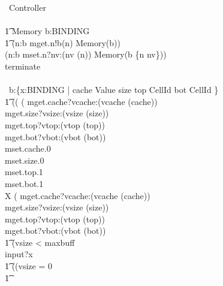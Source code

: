 \documentclass[10pt]{article}
\begin{document}
\begin{circus}
    \circprocess\ Controller \circdef \\
    \circbegin \\
    \t1
        Memory \circdef
            \circvres b:BINDING \circspot \\
            \t1
                (\Extchoice n:\dom b \circspot mget.n!b(n) \then Memory(b)) \\
                \extchoice (\Extchoice n:\dom b \circspot mset.n?nv:(nv \in \delta(n)) \then Memory(b \oplus \{n \mapsto nv\}))\\
                \extchoice terminate \then \Skip \\
        \\
        \circspot
            \circvar\ b:\{x:BINDING | cache \in Value \land size \in \nat \land top \in CellId \land bot \in CellId \} \circspot \\
            \t1
            ((
            (
                mget.cache?vcache:(vcache \in \delta(cache)) \then \\
                mget.size?vsize:(vsize \in \delta(size)) \then \\
                mget.top?vtop:(vtop \in \delta(top)) \then \\
                mget.bot?vbot:(vbot \in \delta(bot)) \then \\
                mset.cache.0 \then \\
                mset.size.0 \then \\
                mset.top.1 \then \\
                mset.bot.1 \then \\
                \circmu X \circspot
                (
                    mget.cache?vcache:(vcache \in \delta(cache)) \then \\
                    mget.size?vsize:(vsize \in \delta(size)) \then \\
                    mget.top?vtop:(vtop \in \delta(top)) \then \\
                    mget.bot?vbot:(vbot \in \delta(bot)) \then \\
                    \t1
                (\lcircguard vsize < maxbuff \rcircguard \\
                 \circguard
                     input?x \then \\
                     \t1
                         ((\lcircguard vsize = 0 \rcircguard \circguard \\
                             \t1

\end{circus}
\end{document}

